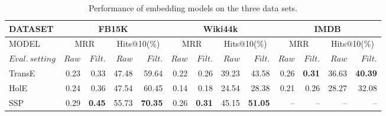 \begin{table}[t]
\centering
\begin{tabular}{|l|r r|r r|r r|r r|r r|r r|} 
 \hline
 DATASET & \multicolumn{4}{|c|}{FB15K} & \multicolumn{4}{|c|}{Wiki44k} & \multicolumn{4}{|c|}{IMDB}\\
 \hline
 MODEL & \multicolumn{2}{|c|}{MRR}& \multicolumn{2}{|c|}{Hits@10(\%)} & \multicolumn{2}{|c|}{MRR}& \multicolumn{2}{|c|}{Hits@10(\%)} & \multicolumn{2}{|c|}{MRR}& \multicolumn{2}{|c|}{Hits@10(\%)} \\
 $Eval.\ setting$ & $Raw$ & $Filt.$ & $Raw$ & $Filt.$ & $Raw$ & $Filt.$ & $Raw$ & $Filt.$ & $Raw$ & $Filt.$ & $Raw$ & $Filt.$\\
 \hline
 TransE& 0.23 & 0.33 & 47.48 & 59.64 & 0.22 & 0.26 & 39.23 & 43.58 & 0.26 & \textbf{0.31} & 36.63 & \textbf{40.39}\\
 HolE & 0.24 & 0.36 & 47.54 & 60.45& 0.14 & 0.18 & 24.54 & 28.38  & 0.21 & 0.26 & 28.27 & 32.08 \\
 SSP & 0.29 & \textbf{0.45}& 55.73 & \textbf{70.35}& 0.26 & \textbf{0.31} & 45.15 & \textbf{51.05} & -- & -- & -- & -- \\
 \hline
\end{tabular}
\caption{Performance of embedding models on the three data sets.}
\label{table:embedding_performance}
\end{table}
